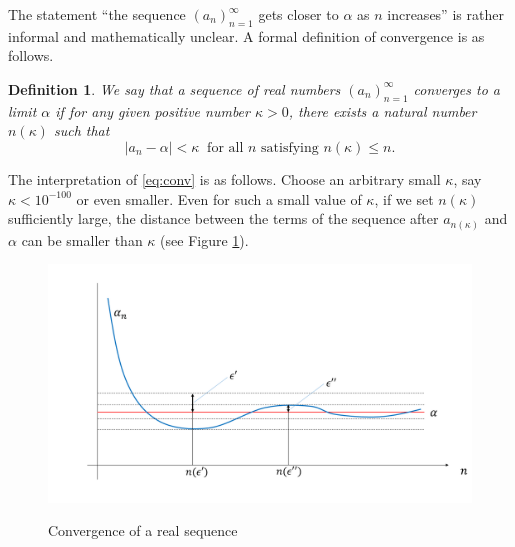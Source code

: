 \documentclass[10.5pt, A4paper, openany, uplatex]{book}
\newtheorem{definition}[theorem]{Definition}
\numberwithin{equation}{section}
\begin{document}
The statement ``the sequence $(a_n)_{n=1}^\infty$ gets closer to $\alpha$ as $n$ increases'' is rather informal and mathematically unclear.
A formal definition of convergence is as follows.

\begin{definition}\label{def:conv}
We say that a sequence of real numbers $(a_n)_{n=1}^\infty$ converges to a limit $\alpha$ if for any given positive number $\kappa > 0$, there exists a natural number $n(\kappa)$ such that
\begin{equation}
	|a_n - \alpha| < \kappa \;\; \text{for all $n$ satisfying } n(\kappa) \leq n. \label{eq:conv}
\end{equation}
\end{definition}

The interpretation of \eqref{eq:conv} is as follows.
Choose an arbitrary small $\kappa$, say $\kappa < 10^{-100}$ or even smaller.
Even for such a small value of $\kappa$, if we set $n(\kappa)$ sufficiently large, the distance between the terms of the sequence after $a_{n(\kappa)}$ and $\alpha$ can be smaller than $\kappa$ (see Figure \ref{fig:limit}).
 
\begin{figure}[h!]
	\begin{center}
	\includegraphics[width=14cm]{Limit.png}\label{fig:limit}
	\caption{Convergence of a real sequence}
	\end{center}
\end{figure}
\end{document}

